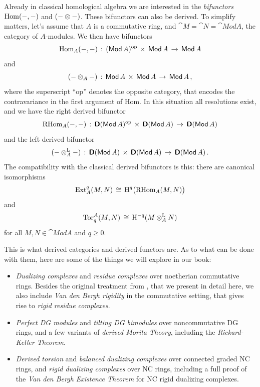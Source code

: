 Already in classical homological algebra we are interested in the {\em 
bifunctors} $\operatorname{Hom}(-, -)$ and $(- \otimes -)$. These bifunctors can also be 
derived. To simplify matters, let's assume that $A$ is a commutative ring, and 
$\cat{M} = \cat{N} = \cat{Mod} A$, the category of $A$-modules. 
We then have bifunctors 
\[ \operatorname{Hom}_A(-, -) \, : \, (\operatorname{\mathsf{Mod}} A)^{\mathrm{op}} \, \times \, \operatorname{\mathsf{Mod}} A
\, \to \, \operatorname{\mathsf{Mod}} A \]
and 
\[ (- \otimes_A -) \, : \, \operatorname{\mathsf{Mod}} A \, \times \, \operatorname{\mathsf{Mod}} A \, \to \, 
\operatorname{\mathsf{Mod}} A \, , \]
where the superscript ``op'' denotes the opposite category, that encodes the
contravariance in the first argument of Hom. 
In this situation all resolutions exist, and we have the right derived 
bifunctor 
\begin{equation} \label{eqn:4995}
\operatorname{RHom}_A(-, -) \, : \, \boldsymbol{\mathsf{D}}(\operatorname{\mathsf{Mod}} A)^{\mathrm{op}} \, \times \, 
\boldsymbol{\mathsf{D}}(\operatorname{\mathsf{Mod}} A) \, \to \, \boldsymbol{\mathsf{D}}(\operatorname{\mathsf{Mod}} A) 
\end{equation}
and the left derived bifunctor 
\begin{equation} \label{eqn:4996}
(- \otimes^{\mathrm{L}}_{A} -) \, : \, \boldsymbol{\mathsf{D}}(\operatorname{\mathsf{Mod}} A) \, \times \, 
\boldsymbol{\mathsf{D}}(\operatorname{\mathsf{Mod}} A) \, \to \, \boldsymbol{\mathsf{D}}(\operatorname{\mathsf{Mod}} A) \, .
\end{equation}
The compatibility with the classical derived bifunctors is this: there are 
canonical isomorphisms 
\begin{equation} \label{eqn:4997}
\operatorname{Ext}^q_A(M, N) \, \cong \,
\operatorname{H}^q \bigl( \operatorname{RHom}_A(M, N) \bigr) 
\end{equation}
and
\begin{equation} \label{eqn:4998}
\operatorname{Tor}_q^A(M, N) \, \cong  \, \operatorname{H}^{-q} (M \otimes^{\mathrm{L}}_{A} N) 
\end{equation}
for all $M, N \in \cat{Mod} A$ and $q \geq 0$.  

This is what derived categories and derived functors are. As to what can be 
done with them, here are some of the things we will explore in our book:
\begin{itemize}
\item {\em Dualizing complexes} and {\em residue complexes} over noetherian 
commutative rings. Besides the original treatment from \cite{RD}, that we 
present in detail here, we also include {\em Van den Bergh rigidity} in the 
commutative setting, that gives rise to {\em rigid residue complexes}. 

\item {\em Perfect DG modules} and {\em tilting DG bimodules}  over 
noncommutative DG rings, and a few variants of {\em derived 
Morita Theory}, including the {\em Rickard-Keller Theorem}. 

\item {\em Derived torsion} and {\em balanced dualizing complexes}
over connected graded NC rings, and {\em rigid 
dualizing complexes} over NC rings, including a full proof of the {\em Van den 
Bergh Existence Theorem} for NC rigid dualizing complexes. 
\end{itemize}

